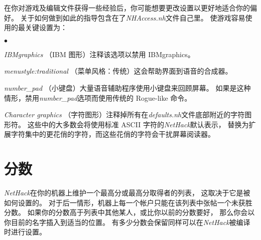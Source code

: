 \documentclass[a4paper, 10pt]{article}
\newcommand{\ib}[1]{\it #1 \hfill}
\newcommand{\blist}[1]
{\begin{list}{$\bullet$}
    {\leftmargin 30mm \topsep 2mm \partopsep 0mm \parsep 0mm \itemsep 1mm
     \labelwidth 28mm \labelsep 2mm
     #1}}
\newcommand{\elist}{\end{list}}
\begin{document}
在你对游戏及编辑文件获得一些经验后，你可能想要更改设置以更好地适合你的偏好。
关于如何做到如此的指导包含在了{\it NHAccess.nh\/}文件自己里。
使游戏容易使用的最关键设置为：
\blist{}
\item[\ib{IBMgraphics}]
（IBM 图形）注释该选项以禁用 IBMgraphics。
\item[\ib{menustyle:traditional}]
（菜单风格：传统）这会帮助界面到语音的合成器。
\item[\ib{number\_pad}]
（小键盘）大量语音辅助程序使用小键盘来回顾屏幕。
如果是这种情形，禁用{\it number\_pad}选项而使用传统的 Rogue-like 命令。
\item[\ib{Character graphics}]
（字符图形）注释掉所有在{\it defaults.nh\/}文件底部附近的字符图形符。
这些中的大多数会将使用标准 ASCII 字符的{\it NetHack\/}默认\zhTransDungeon{}表示，
替换为扩展字符集中的更花俏的字符，而这些花俏的字符会干扰屏幕阅读器。
\elist

\section{分数}

{\it NetHack\/}在你的机器上维护一个最高分或最高分取得者的列表，
这取决于它是被如何设置的。
对于后一情形，机器上每一个帐户只能在该列表中张帖一个未获胜分数。
如果你的分数高于列表中其他某人，或比你以前的分数要好，
那么你会以你目前的名字插入到适当的位置。
有多少分数会保留同样可以在{\it NetHack\/}被编译时进行设置。
\end{document}
